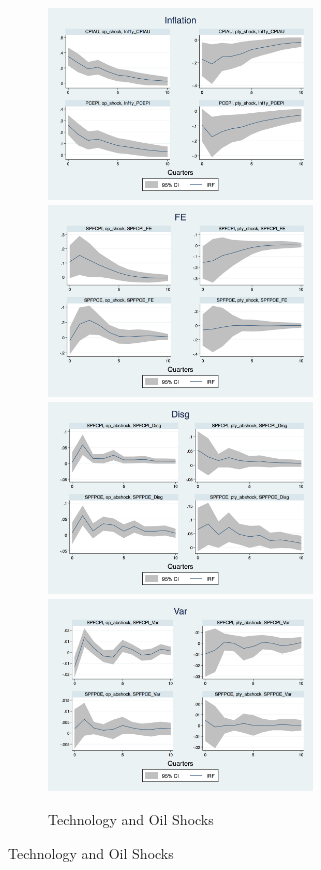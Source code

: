 \documentclass[12pt]{article}
\begin{document}
		\begin{figure}[ht]
		\begin{subfigure}[b]{0.5\textwidth}
			\centering
			\caption{Technology and Oil Shocks}
			\includegraphics[width=7cm]{figures/Inf_ashocks_nmp.png}  
			\smallskip
			\includegraphics[width=7cm]{figures/SPFFE_ashocks_nmp.png} 
			\smallskip 
			\includegraphics[width=7cm]{figures/SPFDisg_ab_ashocks_nmp.png} 
			\smallskip 
			\includegraphics[width=7cm]{figures/SPFVar_ab_ashocks_nmp.png} 
		\end{subfigure}

\end{figure}
\end{document}
